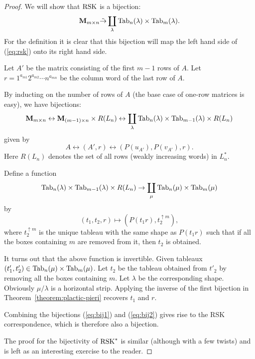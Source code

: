 \documentclass[11pt]{amsproc}
\theoremstyle{definition}
\theoremstyle{example}
\newcommand{\Tab}{\textup{Tab}}
\newcommand{\rsk}{\textup{RSK}}
\begin{document}
\begin{proof}
  We will show that $\rsk$ is a bijection:
  \begin{displaymath}
    \mathbf M_{m\times n} \tilde\to \coprod_\lambda \Tab_n(\lambda)\times \Tab_m(\lambda).
  \end{displaymath}
  For the definition it is clear that this bijection will map the left hand side of (\ref{eq:rsk}) onto its right hand side.

  Let $A'$ be the matrix consisting of the first $m-1$ rows of $A$.
  Let $r=1^{a_{m1}}2^{a_{m2}}\dotsb n^{a_{mn}}$ be the column word of the last row of $A$.

  By inducting on the number of rows of $A$ (the base case of one-row matrices is easy), we have bijections:
  \begin{equation}
    \label{eq:bij1}
    \mathbf M_{m\times n} \leftrightarrow \mathbf M_{(m-1)\times n}\times R(L_n) \leftrightarrow \coprod_\lambda \Tab_n(\lambda)\times \Tab_{m-1}(\lambda)\times R(L_n)
  \end{equation}
  given by
  \begin{displaymath}
    A \leftrightarrow (A',r) \leftrightarrow (P(u_{A'}), P(v_{A'}), r).
  \end{displaymath}
  Here $R(L_n)$ denotes the set of all rows (weakly increasing words) in $L_n^*$.

  Define a function
  \begin{equation}
    \label{eq:bij2}
    \Tab_n(\lambda)\times \Tab_{m-1}(\lambda)\times R(L_n) \to \coprod_\mu \Tab_n(\mu)\times \Tab_m(\mu)
  \end{equation}
  by
  \begin{displaymath}
    (t_1, t_2, r)\mapsto (P(t_1r), t_2^{\uparrow m}),
  \end{displaymath}
  where $t_2^{\uparrow m}$ is the unique tableau with the same shape as $P(t_1r)$ such that if all the boxes containing $m$ are removed from it, then $t_2$ is obtained.

  It turns out that the above function is invertible.
  Given tableaux $(t'_1, t'_2)\in \Tab_n(\mu)\times \Tab_m(\mu)$.
  Let $t_2$ be the tableau obtained from $t'_2$ by removing all the boxes containing $m$.
  Let $\lambda$ be the corresponding shape.
  Obviously $\mu/\lambda$ is a horizontal strip.
  Applying the inverse of the first bijection in Theorem~\ref{theorem:plactic-pieri} recovers $t_1$ and $r$.

  Combining the bijections (\ref{eq:bij1}) and (\ref{eq:bij2}) gives rise to the RSK correspondence, which is therefore also a bijection.

  The proof for the bijectivity of $\rsk^*$ is similar (although with a few twists) and is left as an interesting exercise to the reader.
\end{proof}
\end{document}
